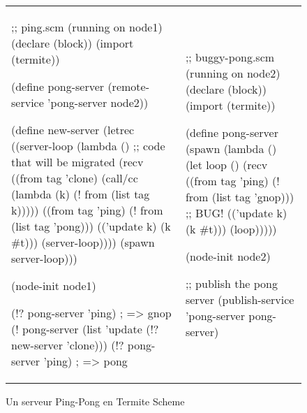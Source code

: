 \begin{figure*}[ht]
  \fontsize{8}{7}
  \begin{tabular}{ll}
\begin{mplisting}{0.5}
;; ping.scm (running on node1)
(declare (block))
(import (termite))

(define pong-server
  (remote-service 'pong-server node2))

(define new-server
  (letrec ((server-loop
            (lambda () ;; code that will be migrated
              (recv
                ((from tag 'clone)
                 (call/cc
                   (lambda (k)
                     (! from (list tag k)))))
                ((from tag 'ping)
                 (! from (list tag 'pong)))
                (('update k)
                 (k #t)))
              (server-loop))))
  (spawn server-loop)))

(node-init node1)

(!? pong-server 'ping) ; => gnop
(! pong-server (list 'update (!? new-server 'clone)))
(!? pong-server 'ping) ; => pong
\end{mplisting}
&
\begin{mplisting}{0.5}
;; buggy-pong.scm (running on node2)
(declare (block))
(import (termite))

(define pong-server
  (spawn
    (lambda ()
      (let loop ()
        (recv
          ((from tag 'ping)
           (! from (list tag 'gnop))) ;; BUG!
          (('update k)
           (k #t)))
        (loop)))))

(node-init node2)

;; publish the pong server
(publish-service 'pong-server pong-server)
\end{mplisting}
  \end{tabular}
  \caption{Un serveur Ping-Pong en Termite Scheme}
  \label{fig:buggy_pong_server}
\end{figure*}

